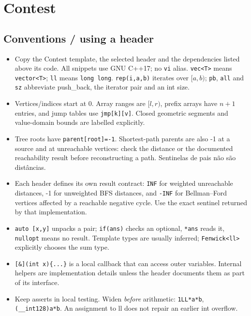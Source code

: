 \chapter{Contest}

\section{Conventions / using a header}
\begin{itemize}[nosep,leftmargin=*]
\item Copy the Contest template, the selected header and the dependencies
listed above its code. All snippets use GNU C++17; no \texttt{vi} alias.
\texttt{vec<T>} means \texttt{vector<T>}; \texttt{ll} means \texttt{long long}.
\texttt{rep(i,a,b)} iterates over $[a,b)$; \texttt{pb}, \texttt{all} and
\texttt{sz} abbreviate push\_back, the iterator pair and an int size.
\item Vertices/indices start at 0. Array ranges are $[l,r)$, prefix arrays
have $n+1$ entries, and jump tables use \texttt{jmp[k][v]}.
Closed geometric segments and value-domain bounds are labelled explicitly.
\item Tree roots have \texttt{parent[root]=-1}. Shortest-path parents
are also -1 at a source and at unreachable vertices: check the distance
or the documented reachability result before reconstructing a path.
Sentinelas de pais não são distâncias.
\item Each header defines its own result contract: \texttt{INF} for
weighted unreachable distances, -1 for unweighted BFS distances, and
\texttt{-INF} for Bellman--Ford vertices affected by a reachable negative cycle.
Use the exact sentinel returned by that implementation.
\item \texttt{auto [x,y]} unpacks a pair; \texttt{if(ans)} checks an optional,
\texttt{*ans} reads it, \texttt{nullopt} means no result. Template types are
usually inferred; \texttt{Fenwick<ll>} explicitly chooses the sum type.
\item \texttt{[\&](int x)\{...\}} is a local callback that can access
outer variables. Internal helpers are implementation details unless
the header documents them as part of its interface.
\item Keep asserts in local testing. Widen \emph{before} arithmetic:
\texttt{1LL*a*b}, \texttt{(\_\_int128)a*b}. An assignment to ll
does not repair an earlier int overflow.
\end{itemize}

